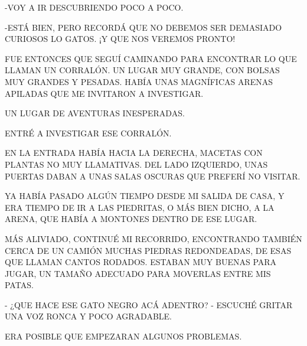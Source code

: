 -VOY A IR DESCUBRIENDO POCO A POCO.

-ESTÁ BIEN, PERO RECORDÁ QUE NO DEBEMOS SER DEMASIADO CURIOSOS LO GATOS. ¡Y QUE  NOS VEREMOS PRONTO!
\newline	 

FUE ENTONCES QUE SEGUÍ CAMINANDO PARA ENCONTRAR LO QUE LLAMAN UN CORRALÓN. UN LUGAR MUY GRANDE, CON BOLSAS MUY GRANDES Y PESADAS. HABÍA UNAS MAGNÍFICAS ARENAS APILADAS QUE ME INVITARON A INVESTIGAR.



\newpage
{}

\vspace{.8\textheight}
UN LUGAR DE AVENTURAS INESPERADAS.		



\newpage
{}
ENTRÉ A INVESTIGAR ESE CORRALÓN. 

EN LA ENTRADA HABÍA HACIA LA DERECHA, MACETAS CON PLANTAS NO MUY LLAMATIVAS. DEL LADO IZQUIERDO, UNAS PUERTAS DABAN A UNAS SALAS OSCURAS QUE PREFERÍ NO VISITAR.

YA HABÍA PASADO ALGÚN TIEMPO DESDE MI SALIDA DE CASA, Y ERA TIEMPO DE IR A LAS PIEDRITAS, O MÁS BIEN DICHO, A LA ARENA, QUE HABÍA A MONTONES DENTRO DE ESE LUGAR.

MÁS ALIVIADO, CONTINUÉ MI RECORRIDO, ENCONTRANDO TAMBIÉN CERCA DE UN CAMIÓN MUCHAS PIEDRAS REDONDEADAS, DE ESAS QUE LLAMAN CANTOS RODADOS. ESTABAN MUY BUENAS PARA JUGAR, UN TAMAÑO ADECUADO PARA MOVERLAS ENTRE MIS PATAS.

- ¿QUE HACE ESE GATO NEGRO ACÁ ADENTRO? - ESCUCHÉ GRITAR UNA VOZ RONCA Y POCO AGRADABLE.

ERA POSIBLE QUE EMPEZARAN ALGUNOS  PROBLEMAS. 


\newpage
{}

